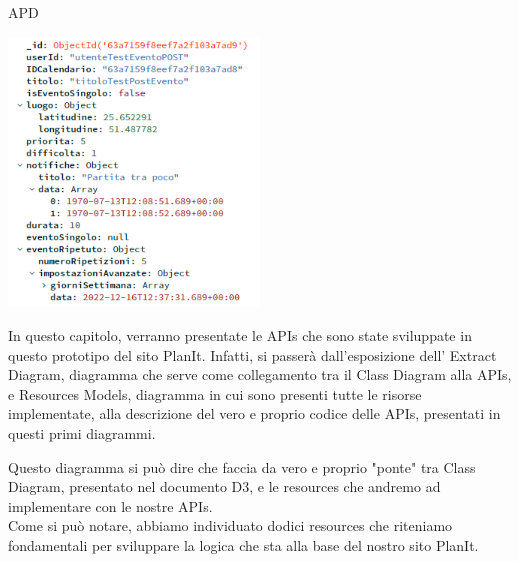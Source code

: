 \begin{listaPersonale} {APD}
\begin{center}
    \end{center}
    \begin{center}
        \includegraphics[width=0.5\textwidth, height=0.4\textheight]{img/png/DB/evento_ripetuto_intero.png}
    \end{center}
    \newpage
    In questo capitolo, verranno presentate le APIs che sono state sviluppate in questo prototipo del sito PlanIt. Infatti, si passerà dall'esposizione dell' Extract Diagram, diagramma che serve come collegamento tra il Class Diagram alla APIs, e Resources Models, diagramma in cui sono presenti tutte le risorse implementate, alla descrizione del vero e proprio codice delle APIs, presentati in questi primi diagrammi.
    \begin{listaPersonale2}[APD]{}
        Questo diagramma si può dire che faccia da vero e proprio "ponte" tra Class Diagram, presentato nel documento D3, e le resources che andremo ad implementare con le nostre APIs. \\
        Come si può notare, abbiamo individuato dodici resources che riteniamo fondamentali per sviluppare la logica che sta alla base del nostro sito PlanIt. \\

\end{listaPersonale2}
\end{listaPersonale}
